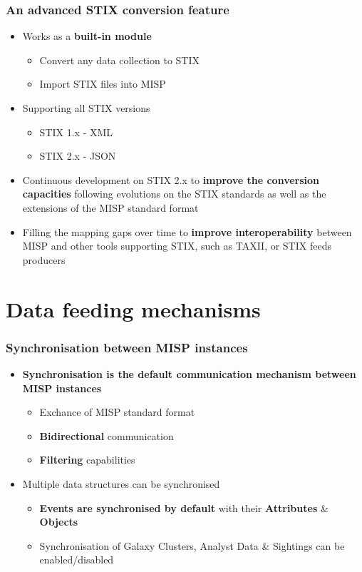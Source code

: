\begin{frame}
    \frametitle{An advanced STIX conversion feature}
    \begin{itemize}
        \item Works as a \textbf{built-in module}
        \begin{itemize}
            \item Convert any data collection to STIX
            \item Import STIX files into MISP
        \end{itemize}
        \item Supporting all STIX versions
        \begin{itemize}
            \item STIX 1.x - XML
            \item STIX 2.x - JSON
        \end{itemize}
        \item Continuous development on STIX 2.x to \textbf{improve the conversion capacities} following evolutions on the STIX standards as well as the extensions of the MISP standard format
        \item Filling the mapping gaps over time to \textbf{improve interoperability} between MISP and other tools supporting STIX, such as TAXII, or STIX feeds producers
    \end{itemize}
\end{frame}

\section{Data feeding mechanisms}

\begin{frame}
    \frametitle{Synchronisation between MISP instances}
    \begin{itemize}
        \item \textbf{Synchronisation is the default communication mechanism between MISP instances}
        \begin{itemize}
            \item Exchance of MISP standard format
            \item \textbf{Bidirectional} communication
            \item \textbf{Filtering} capabilities
        \end{itemize}
        \item Multiple data structures can be synchronised
        \begin{itemize}
            \item \textbf{Events are synchronised by default} with their \textbf{Attributes} \& \textbf{Objects}
            \item Synchronisation of Galaxy Clusters, Analyst Data \& Sightings can be enabled/disabled
        \end{itemize}
    \end{itemize}
\end {frame}

